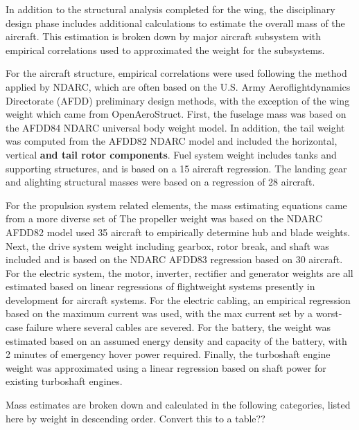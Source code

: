 
In addition to the structural analysis completed for the wing, the disciplinary design phase includes additional calculations to estimate the overall mass of the aircraft.
This estimation is broken down by major aircraft subsystem with empirical correlations used to approximated the weight for the subsystems.

For the aircraft structure, empirical correlations were used following the method applied by NDARC\cite{NDARC}, which are often based on the U.S. Army Aeroflightdynamics Directorate (AFDD) preliminary design methods, with the exception of the wing weight which came from OpenAeroStruct.
First, the fuselage mass was based on the AFDD84 NDARC universal body weight model.
In addition, the tail weight was computed from the AFDD82 NDARC model and included the horizontal, vertical \textbf{and tail rotor components}.
Fuel system weight includes tanks and supporting structures, and is based on a 15 aircraft regression.
The landing gear and alighting structural masses were based on a regression of 28 aircraft.

For the propulsion system related elements, the mass estimating equations came from a more diverse set of 
The propeller weight was based on the NDARC AFDD82 model used 35 aircraft to empirically determine hub and blade weights. 
Next, the drive system weight including gearbox, rotor break, and shaft was included and is based on the NDARC AFDD83 regression based on 30 aircraft.
For the electric system, the motor, inverter, rectifier and generator weights are all estimated based on linear regressions of flightweight systems presently in development for aircraft systems.
For the electric cabling, an empirical regression based on the maximum current was used, with the max current set by a worst-case failure where several cables are severed. 
For the battery, the weight was estimated based on an assumed energy density and capacity of the battery, with 2 minutes of emergency hover power required.
Finally, the turboshaft engine weight was approximated using a linear regression based on shaft power for existing turboshaft engines.

Mass estimates are broken down and calculated in the following categories,
listed here by weight in descending order.
Convert this to a table??

